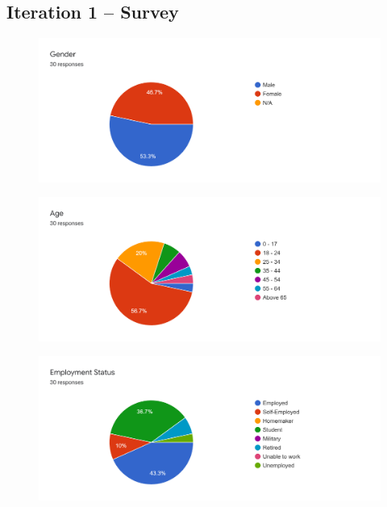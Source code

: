\newpage

\begin{appendices}
  \section{Iteration 1 – Survey} \label{appendix:survey}
  
    \begin{figure}[H]
      \centering
      \includegraphics[width=\linewidth]{img/Survey/Q1.png}
    \end{figure}
    \begin{figure}[H]
      \centering
      \includegraphics[width=\linewidth]{img/Survey/Q2.png}
    \end{figure}
    \begin{figure}[H]
      \centering
      \includegraphics[width=\linewidth]{img/Survey/Q3.png}

\end{figure}
\end{appendices}
